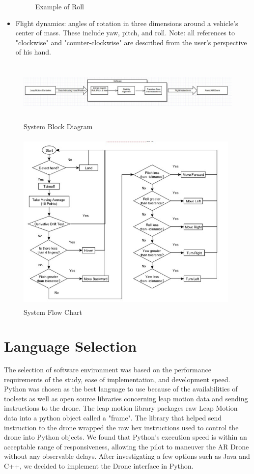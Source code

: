 \documentclass[letterpaper,english, 12pt]{article}
\begin{document}
\begin{itemize}
\begin{figure}[t]
			\caption{Example of Roll}
		\end{figure}
		\item Flight dynamics: angles of rotation in three dimensions around a vehicle's center of mass. These include yaw, pitch, and roll. Note: all references to "clockwise" and "counter-clockwise" are described from the user's perspective of his hand.
\end{itemize}

\begin{figure}[t]
	\centering
	\includegraphics[height=3cm,width=150mm]{pics/blockDiagram1.jpg}
	\caption{System Block Diagram}
\end{figure}


\begin{figure}[t]
	\centering
	\includegraphics[height=9cm,width=110mm]{pics/controlFlowChart.jpg}
	\caption{System Flow Chart}
\end{figure}


\section*{Language Selection}

The selection of software environment was based on the performance requirements of the study, ease of implementation, and development speed. Python was chosen as the best language to use because of the availabilities of toolsets as well as open source libraries concerning leap motion data and sending instructions to the drone. The leap motion library packages raw Leap Motion data into a python object called a "frame"\cite{cit9}. The library that helped send instruction to the drone wrapped the raw hex instructions used to control the drone into Python objects. We found that Python's execution speed is within an acceptable range of responsiveness, allowing the pilot to maneuver the AR Drone without any observable delays. After investigating a few options such as Java and C++, we decided to implement the Drone interface in Python.
\end{document}
